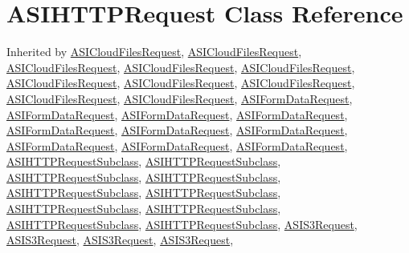 \hypertarget{interface_a_s_i_h_t_t_p_request}{
\section{\-A\-S\-I\-H\-T\-T\-P\-Request \-Class \-Reference}
\label{interface_a_s_i_h_t_t_p_request}
}


\-Inherited by \hyperlink{interface_a_s_i_cloud_files_request}{\-A\-S\-I\-Cloud\-Files\-Request}, \hyperlink{interface_a_s_i_cloud_files_request}{\-A\-S\-I\-Cloud\-Files\-Request}, \hyperlink{interface_a_s_i_cloud_files_request}{\-A\-S\-I\-Cloud\-Files\-Request}, \hyperlink{interface_a_s_i_cloud_files_request}{\-A\-S\-I\-Cloud\-Files\-Request}, \hyperlink{interface_a_s_i_cloud_files_request}{\-A\-S\-I\-Cloud\-Files\-Request}, \hyperlink{interface_a_s_i_cloud_files_request}{\-A\-S\-I\-Cloud\-Files\-Request}, \hyperlink{interface_a_s_i_cloud_files_request}{\-A\-S\-I\-Cloud\-Files\-Request}, \hyperlink{interface_a_s_i_cloud_files_request}{\-A\-S\-I\-Cloud\-Files\-Request}, \hyperlink{interface_a_s_i_cloud_files_request}{\-A\-S\-I\-Cloud\-Files\-Request}, \hyperlink{interface_a_s_i_cloud_files_request}{\-A\-S\-I\-Cloud\-Files\-Request}, \hyperlink{interface_a_s_i_form_data_request}{\-A\-S\-I\-Form\-Data\-Request}, \hyperlink{interface_a_s_i_form_data_request}{\-A\-S\-I\-Form\-Data\-Request}, \hyperlink{interface_a_s_i_form_data_request}{\-A\-S\-I\-Form\-Data\-Request}, \hyperlink{interface_a_s_i_form_data_request}{\-A\-S\-I\-Form\-Data\-Request}, \hyperlink{interface_a_s_i_form_data_request}{\-A\-S\-I\-Form\-Data\-Request}, \hyperlink{interface_a_s_i_form_data_request}{\-A\-S\-I\-Form\-Data\-Request}, \hyperlink{interface_a_s_i_form_data_request}{\-A\-S\-I\-Form\-Data\-Request}, \hyperlink{interface_a_s_i_form_data_request}{\-A\-S\-I\-Form\-Data\-Request}, \hyperlink{interface_a_s_i_form_data_request}{\-A\-S\-I\-Form\-Data\-Request}, \hyperlink{interface_a_s_i_form_data_request}{\-A\-S\-I\-Form\-Data\-Request}, \hyperlink{interface_a_s_i_h_t_t_p_request_subclass}{\-A\-S\-I\-H\-T\-T\-P\-Request\-Subclass}, \hyperlink{interface_a_s_i_h_t_t_p_request_subclass}{\-A\-S\-I\-H\-T\-T\-P\-Request\-Subclass}, \hyperlink{interface_a_s_i_h_t_t_p_request_subclass}{\-A\-S\-I\-H\-T\-T\-P\-Request\-Subclass}, \hyperlink{interface_a_s_i_h_t_t_p_request_subclass}{\-A\-S\-I\-H\-T\-T\-P\-Request\-Subclass}, \hyperlink{interface_a_s_i_h_t_t_p_request_subclass}{\-A\-S\-I\-H\-T\-T\-P\-Request\-Subclass}, \hyperlink{interface_a_s_i_h_t_t_p_request_subclass}{\-A\-S\-I\-H\-T\-T\-P\-Request\-Subclass}, \hyperlink{interface_a_s_i_h_t_t_p_request_subclass}{\-A\-S\-I\-H\-T\-T\-P\-Request\-Subclass}, \hyperlink{interface_a_s_i_h_t_t_p_request_subclass}{\-A\-S\-I\-H\-T\-T\-P\-Request\-Subclass}, \hyperlink{interface_a_s_i_h_t_t_p_request_subclass}{\-A\-S\-I\-H\-T\-T\-P\-Request\-Subclass}, \hyperlink{interface_a_s_i_h_t_t_p_request_subclass}{\-A\-S\-I\-H\-T\-T\-P\-Request\-Subclass}, \hyperlink{interface_a_s_i_s3_request}{\-A\-S\-I\-S3\-Request}, \hyperlink{interface_a_s_i_s3_request}{\-A\-S\-I\-S3\-Request}, \hyperlink{interface_a_s_i_s3_request}{\-A\-S\-I\-S3\-Request}, \hyperlink{interface_a_s_i_s3_request}{\-A\-S\-I\-S3\-Request}, 
